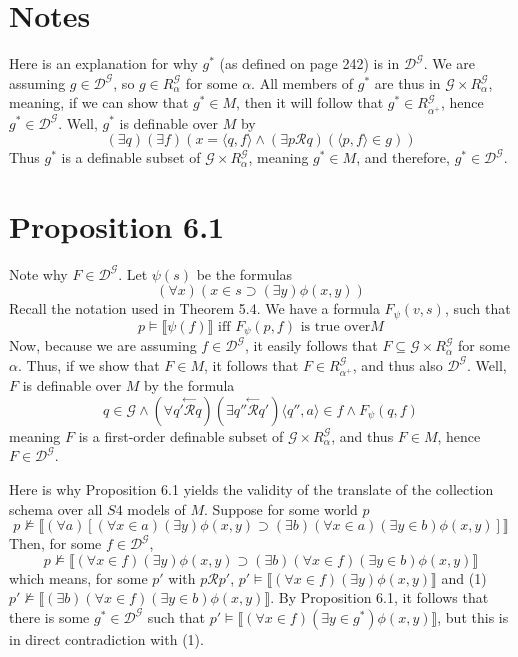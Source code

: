 \documentclass{article}
\newcommand{\lbc}{\llbracket}
\newcommand{\rbc}{\rrbracket}
\newcommand{\ltop}[1]{\stackrel{\leftarrow}{#1}}
\theoremstyle{definition}
\begin{document}
\section*{Notes}
Here is an explanation for why $g^*$ (as defined on page 242) is in $\mathcal{D}^\mathcal{G}$. We are assuming 
$g\in\mathcal{D}^\mathcal{G}$, so $g\in R^\mathcal{G}_\alpha$ for some $\alpha$. All members of 
$g^*$ are thus in $\mathcal{G}\times R^\mathcal{G}_\alpha$, meaning, if we can show that $g^*\in M$, then 
it will follow that $g^*\in R^\mathcal{G}_{\alpha^+}$, hence $g^*\in\mathcal{D}^\mathcal{G}$. Well, 
$g^*$ is definable over $M$ by
\[ (\exists q)(\exists f)(x=\langle q,f\rangle\wedge(\exists p\mathcal{R}q)(\langle p,f\rangle\in g)) \]
Thus $g^*$ is a definable subset of $\mathcal{G}\times R^\mathcal{G}_\alpha$, meaning 
$g^*\in M$, and therefore, $g^*\in\mathcal{D}^\mathcal{G}$.

\section*{Proposition 6.1}
Note why $F\in\mathcal{D}^\mathcal{G}$. Let $\psi(s)$ be the formulas
\[ (\forall x)(x\in s\supset(\exists y)\phi(x,y)) \]
Recall the notation used in Theorem 5.4. We have a formula 
$F_\psi(v,s)$, such that 
\[ p\vDash\lbc\psi(f)\rbc\textrm{ iff }F_\psi(p,f)\textrm{ is true over}M \]
Now, because we are assuming $f\in\mathcal{D}^\mathcal{G}$, it easily follows that 
$F\subseteq\mathcal{G}\times R^\mathcal{G}_\alpha$ for some $\alpha$. Thus, if we show that 
$F\in M$, it follows that $F\in R^\mathcal{G}_{\alpha^+}$, and thus also $\mathcal{D}^\mathcal{G}$. Well, 
$F$ is definable over $M$ by the formula
\[ q\in\mathcal{G}\wedge(\forall q'\ltop{\mathcal{R}}q)(\exists q''\ltop{\mathcal{R}}q')\langle q'',a\rangle\in f\wedge F_\psi(q,f) \]
meaning $F$ is a first-order definable subset of $\mathcal{G}\times R^\mathcal{G}_\alpha$, and thus 
$F\in M$, hence $F\in\mathcal{D}^\mathcal{G}$.

Here is why Proposition 6.1 yields the validity of the translate of the collection schema over all 
$S4$ models of $M$. Suppose for some world $p$
\[ p\nvDash\lbc(\forall a)[(\forall x\in a)(\exists y)\phi(x,y)\supset(\exists b)(\forall x\in a)(\exists y\in b)\phi(x,y)]\rbc \]
Then, for some $f\in\mathcal{D}^\mathcal{G}$,
\[ p\nvDash\lbc(\forall x\in f)(\exists y)\phi(x,y)\supset(\exists b)(\forall x\in f)(\exists y\in b)\phi(x,y)\rbc \]
which means, for some $p'$ with $p\mathcal{R}p'$,
$p'\vDash\lbc(\forall x\in f)(\exists y)\phi(x,y)\rbc$ and (1) $p'\nvDash\lbc(\exists b)(\forall x\in f)(\exists y\in b)\phi(x,y)\rbc$.
By Proposition 6.1, it follows that there is some $g^*\in\mathcal{D}^\mathcal{G}$ such that 
$p'\vDash\lbc(\forall x\in f)(\exists y\in g^*)\phi(x,y)\rbc$, but this is in direct contradiction with (1).
\end{document}
